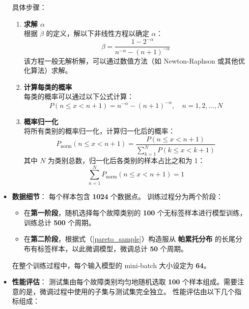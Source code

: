 \documentclass[master]{thesis-uestc}
\begin{document}
\begin{itemize}
    具体步骤：

    \begin{enumerate}
        \item \textbf{求解 $\alpha$} \\
        根据 $\beta$ 的定义，解以下非线性方程以确定 $\alpha$：
        \begin{equation}
        \beta = \frac{1 - 2^{-\alpha}}{n^{-\alpha} - (n+1)^{-\alpha}}
        \end{equation}
        该方程一般无解析解，可以通过数值方法（如 Newton-Raphson 或其他优化算法）求解。

        \item \textbf{计算每类的概率} \\
        每类的概率可以通过以下公式计算：
        \begin{equation}
        P(n \leq x < n+1) = n^{-\alpha} - (n+1)^{-\alpha}, \quad n = 1, 2, \dots, N
        \end{equation}

        \item \textbf{概率归一化} \\
        将所有类别的概率归一化，计算归一化后的概率：
        \begin{equation}
        P_{\text{norm}}(n \leq x < n+1) = \frac{P(n \leq x < n+1)}{\sum_{k=1}^N P(k \leq x < k+1)}
        \label{pareto_sample}
        \end{equation}
        其中 $N$ 为类别总数，归一化后各类别的样本占比之和为 1：
        \begin{equation}
        \sum_{n=1}^N P_{\text{norm}}(n \leq x < n+1) = 1
        \end{equation}
    \end{enumerate}
    \item \textbf{数据细节}：
      每个样本包含 \textbf{1024} 个数据点。
      训练过程分为两个阶段：
      \begin{itemize}
          \item 在\textbf{第一阶段}，随机选择每个故障类别的 \textbf{100} 个无标签样本进行模型训练，训练总计 \textbf{500} 个周期。
          \item 在\textbf{第二阶段}，根据式（\ref{pareto_sample}）构造服从 \textbf{帕累托分布} 的长尾分布有标签样本，以此微调模型，微调总计 \textbf{50} 个周期。
      \end{itemize}
      在整个训练过程中，每个输入模型的 mini-batch 大小设定为 \textbf{64}。
      
      \item \textbf{性能评估}：  
      测试集由每个故障类别均匀地随机选取 \textbf{100} 个样本组成。需要注意的是，微调过程中使用的子集与测试集完全独立。  
      性能评估由以下几个指标组成：


\end{itemize}
\end{document}
